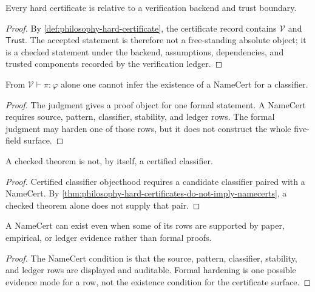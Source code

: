 \begin{theorem}
\label{thm:philosophy-hard-certificates-backend-relative}
Every hard certificate is relative to a verification backend and trust
boundary.
\end{theorem}
\begin{proof}
By \autoref{def:philosophy-hard-certificate}, the certificate record
contains $\mathcal{V}$ and $\mathsf{Trust}$. The accepted statement is
therefore not a free-standing absolute object; it is a checked statement
under the backend, assumptions, dependencies, and trusted components
recorded by the verification ledger.
\end{proof}

\begin{theorem}
\label{thm:philosophy-hard-certificates-do-not-imply-namecerts}
From $\mathcal{V}\vdash \pi:\varphi$ alone one cannot infer the existence
of a NameCert for a classifier.
\end{theorem}
\begin{proof}
The judgment gives a proof object for one formal statement. A NameCert
requires source, pattern, classifier, stability, and ledger rows. The
formal judgment may harden one of those rows, but it does not construct
the whole five-field surface.
\end{proof}

\begin{corollary}
\label{cor:philosophy-verified-theorem-not-certified-classifier}
A checked theorem is not, by itself, a certified classifier.
\end{corollary}
\begin{proof}
Certified classifier objecthood requires a candidate classifier paired
with a NameCert. By
\autoref{thm:philosophy-hard-certificates-do-not-imply-namecerts}, a
checked theorem alone does not supply that pair.
\end{proof}

\begin{theorem}
\label{thm:philosophy-namecert-existence-not-full-hardening}
A NameCert can exist even when some of its rows are supported by paper,
empirical, or ledger evidence rather than formal proofs.
\end{theorem}
\begin{proof}
The NameCert condition is that the source, pattern, classifier,
stability, and ledger rows are displayed and auditable. Formal hardening
is one possible evidence mode for a row, not the existence condition for
the certificate surface.
\end{proof}

